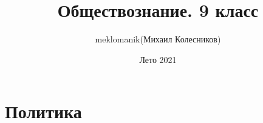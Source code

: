 \documentclass[a4paper, 12pt]{article}
\begin{document}
    \title{Обществознание. 9 класс}
    \author{meklomanik(Михаил Колесников)}
    \date{Лето 2021}
    \maketitle \clearpage\tableofcontents \clearpage
    \section{Политика}
    \subsection{}
\end{document}
